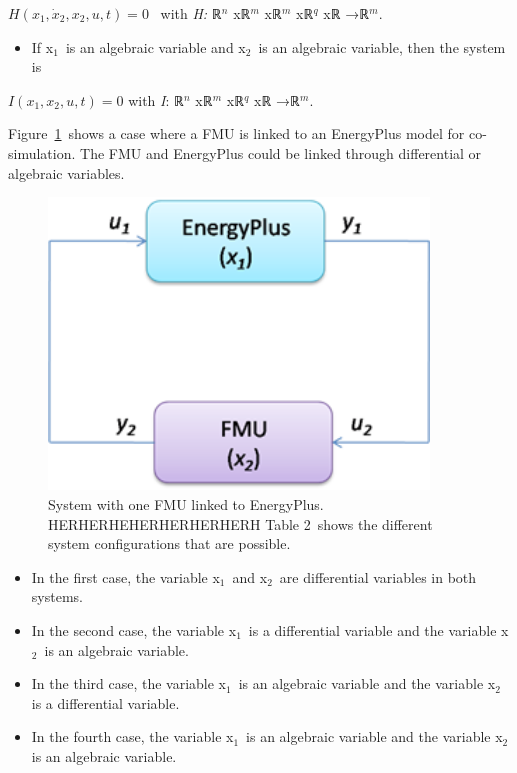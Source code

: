 \(H\left(x_1,\dot x_2,x_2,u,t\right) = 0\) ~with \emph{H:} ℝ\(^{n}\) xℝ\(^{m}\) xℝ\(^{m}\) xℝ\(^{q}\) xℝ →ℝ\(^{m}\).

\begin{itemize}
\tightlist
\item
  If x\(_{1}\)~is an algebraic variable and x\(_{2}\)~is an algebraic variable, then the system is
\end{itemize}

\(I\left(x_1,x_2,u,t\right) = 0\) with \emph{I}: ℝ\(^{n}\) xℝ\(^{m}\) xℝ\(^{q}\) xℝ →ℝ\(^{m}\).

Figure~\ref{fig:system-with-one-fmu-linked-to-energyplus.}~shows a case where a FMU is linked to an EnergyPlus model for co-simulation. The FMU and EnergyPlus could be linked through differential or algebraic variables.

\begin{figure}[hbtp] %
\centering
\includegraphics[width=0.9\textwidth, height=0.9\textheight, keepaspectratio=true]{media/image016.png}
\caption{System with one FMU linked to EnergyPlus. HERHERHEHERHERHERHERH Table 2 shows the different system configurations that are possible. \protect \label{fig:system-with-one-fmu-linked-to-energyplus.}}
\end{figure}

\begin{itemize}
\item
  In the first case, the variable x\(_{1}\)~and x\(_{2}\)~are differential variables in both systems.
\item
  In the second case, the variable x\(_{1}\)~is a differential variable and the variable x\(_{2}\)~is an algebraic variable.
\item
  In the third case, the variable x\(_{1}\)~is an algebraic variable and the variable x\(_{2}\) is a differential variable.
\item
  In the fourth case, the variable x\(_{1}\)~is an algebraic variable and the variable x\(_{2}\) is an algebraic variable.
\end{itemize}

